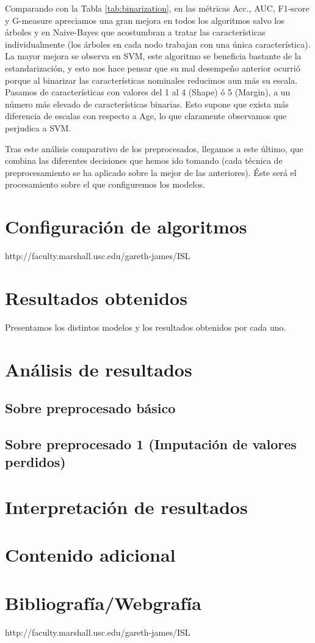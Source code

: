 \documentclass{article}
\begin{document}
Comparando con la Tabla \ref{tab:binarization}, en las métricas Acc.,
AUC, F1-score y G-measure apreciamos una gran mejora en todos los
algoritmos salvo los árboles y en Naive-Bayes que acostumbran a tratar
las características individualmente (los árboles en cada nodo trabajan
con una única característica). La mayor mejora se observa en SVM, este
algoritmo se beneficia bastante de la estandarización, y esto nos hace
pensar que su mal desempeño anterior ocurrió porque al binarizar las
características nominales reducimos aun más su escala. Pasamos de
características con valores del 1 al 4 (Shape) ó 5 (Margin), a un
número más elevado de características binarias. Esto supone que exista
más diferencia de escalas con respecto a Age, lo que claramente
observamos que perjudica a SVM.

Tras este análisis comparativo de los preprocesados, llegamos a este
último, que combina las diferentes decisiones que hemos ido tomando
(cada técnica de preprocesamiento se ha aplicado sobre la mejor de las
anteriores). Éste será el procesamiento sobre el que configuremos los
modelos.

\section{Configuración de algoritmos} \label{configuracion}

http://faculty.marshall.usc.edu/gareth-james/ISL

\section{Resultados obtenidos} \label{resultados}

Presentamos los distintos modelos y los resultados obtenidos por cada
uno.

\section{Análisis de resultados} \label{sec:analisis}

\subsection{Sobre preprocesado básico}

\subsection{Sobre preprocesado 1 (Imputación de valores perdidos)}

\section{Interpretación de resultados}

\section{Contenido adicional}

\section{Bibliografía/Webgrafía}

http://faculty.marshall.usc.edu/gareth-james/ISL
\end{document}

